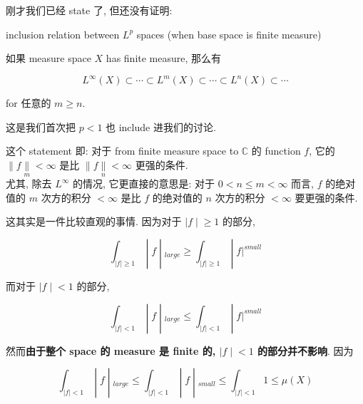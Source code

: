 \documentclass{qlnotes-export}
\begin{document}
刚才我们已经 state 了, 但还没有证明:

\begin{theorem}{inclusion relation between \(L^{p}\) spaces (when base space is finite
measure)}\label{thm-09-l-p-space-and-inequalities-inclusion-relation-between-l-p-spaces-when-base-space-is-finite}

如果 measure space \(X\) has finite measure, 那么有

\[L^{\infty}(X) \subset \cdots \subset L^{m}(X) \subset \cdots \subset L^{n}(X) \subset \cdots\]

for 任意的 \(m \geq n\).

\end{theorem}

这是我们首次把 \(p < 1\) 也 include 进我们的讨论.

这个 statement 即: 对于 from finite measure space to \(\mathbb{C}\) 的 function \(f\), 它的 \(\parallel f\underset{m}{\parallel} < \infty\) 是比 \(\parallel f\underset{n}{\parallel} < \infty\) 更强的条件.\\
尤其, 除去 \(L^{\infty}\) 的情况, 它更直接的意思是: 对于 \(0 < n \leq m < \infty\) 而言, \(f\) 的绝对值的 \(m\) 次方的积分 \(< \infty\) 是比 \(f\) 的绝对值的 \(n\) 次方的积分 \(< \infty\) 要更强的条件.

这其实是一件比较直观的事情. 因为对于 \(\left. |f \middle| \geq 1 \right.\) 的部分,

\[\left. \int_{|f| \geq 1} \middle| f \middle| {}_{large} \geq \int_{|f| \geq 1} \middle| f|^{small} \right.\]

而对于 \(\left. |f \middle| < 1 \right.\) 的部分,

\[\left. \int_{|f| < 1} \middle| f \middle| {}_{large} \leq \int_{|f| < 1} \middle| f|^{small} \right.\]

然而\textbf{由于整个 space 的 measure 是 finite 的, \(\left. |f \middle| < 1 \right.\) 的部分并不影响}. 因为

\[\left. \int_{|f| < 1} \middle| f \middle| {}_{large} \leq \int_{|f| < 1} \middle| f \middle| {}_{small} \leq \int_{|f| < 1}1 \leq \mu(X) \right.\]
\end{document}
